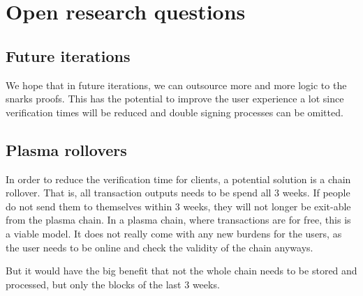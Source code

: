 \documentclass[11pt,parskip=full]{scrartcl}%
\begin{document}
\section{Open research questions}

\subsection{Future iterations}
We hope that in future iterations, we can outsource more and more logic to the snarks proofs. 
This has the potential to improve the user experience a lot since verification times will be reduced and double signing processes can be omitted. 

\subsection{Plasma rollovers}
In order to reduce the verification time for clients, a potential solution is a chain rollover. 
That is, all transaction outputs needs to be spend all 3 weeks. 
If people do not send them to themselves within 3 weeks, they will not longer be exit-able from the plasma chain. 
In a plasma chain, where transactions are for free, this is a viable model. 
It does not really come with any new burdens for the users, as the user needs to be online and check the validity of the chain anyways.

But it would have the big benefit that not the whole chain needs to be stored and processed, but only the blocks of the last 3 weeks. 
\end{document}
